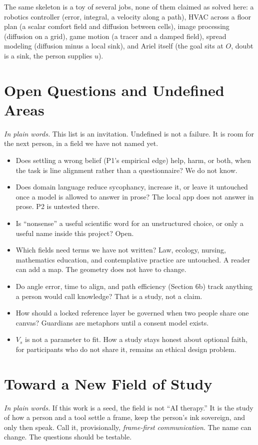 \documentclass[11pt]{article}
\begin{document}
The same skeleton is a toy of several jobs, none of them claimed as solved here: a robotics controller (error, integral, a velocity along a path), HVAC across a floor plan (a scalar comfort field and diffusion between cells), image processing (diffusion on a grid), game motion (a tracer and a damped field), spread modeling (diffusion minus a local sink), and Ariel itself (the goal sits at \(O\), doubt is a sink, the person supplies \(u\)).

\section{Open Questions and Undefined Areas}
\textit{In plain words.} This list is an invitation. Undefined is not a failure. It is room for the next person, in a field we have not named yet.

\begin{itemize}[leftmargin=1.2em]
\item Does settling a wrong belief (P1's empirical edge) help, harm, or both, when the task is line alignment rather than a questionnaire? We do not know.
\item Does domain language reduce sycophancy, increase it, or leave it untouched once a model is allowed to answer in prose? The local app does not answer in prose. P2 is untested there.
\item Is ``nonsense'' a useful scientific word for an unstructured choice, or only a useful name inside this project? Open.
\item Which fields need terms we have not written? Law, ecology, nursing, mathematics education, and contemplative practice are untouched. A reader can add a map. The geometry does not have to change.
\item Do angle error, time to align, and path efficiency (Section 6b) track anything a person would call knowledge? That is a study, not a claim.
\item How should a locked reference layer be governed when two people share one canvas? Guardians are metaphors until a consent model exists.
\item $V_s$ is not a parameter to fit. How a study stays honest about optional faith, for participants who do not share it, remains an ethical design problem.
\end{itemize}

\section{Toward a New Field of Study}
\textit{In plain words.} If this work is a seed, the field is not ``AI therapy.'' It is the study of how a person and a tool settle a frame, keep the person's ink sovereign, and only then speak. Call it, provisionally, \emph{frame-first communication}. The name can change. The questions should be testable.
\end{document}
